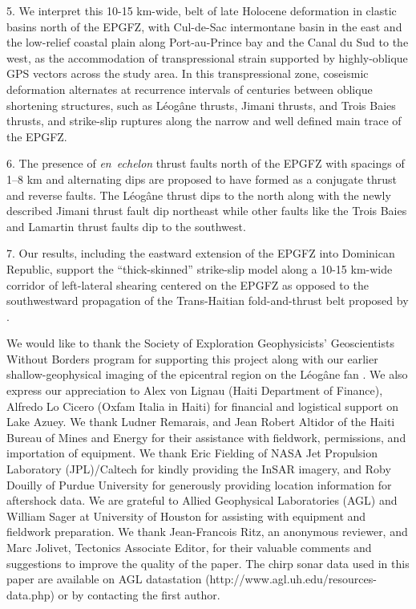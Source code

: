 \documentclass[linenumbers,draft]{agujournal}
\begin{document}
5.  We interpret this 10-15 km-wide, belt of late Holocene deformation in clastic basins north of the EPGFZ, with Cul-de-Sac intermontane basin in the east and the low-relief coastal plain along Port-au-Prince bay and the Canal du Sud to the west, as the accommodation of transpressional strain supported by highly-oblique GPS vectors across the study area. In this transpressional zone, coseismic deformation alternates at recurrence intervals of centuries between oblique shortening structures, such as L\'eog\^ane thrusts, Jimani thrusts, and Trois Baies thrusts, and strike-slip ruptures along the narrow and well defined main trace of the EPGFZ.

6. The presence of \textit{en~echelon} thrust faults north of the EPGFZ with spacings of 1--8 km and alternating dips are proposed to have formed as a conjugate thrust and reverse faults. The L\'eog\^ane thrust dips to the north along with the newly described Jimani thrust fault dip northeast while other faults like the Trois Baies and Lamartin thrust faults dip to the southwest.  

7. Our results, including the eastward extension of the EPGFZ into Dominican Republic, support the ``thick-skinned'' strike-slip model along a 10-15 km-wide corridor of left-lateral shearing centered on the EPGFZ as opposed to the southwestward propagation of the Trans-Haitian fold-and-thrust belt proposed by \citet{pubellier2000plate}.

\acknowledgments
We would like to thank the Society of Exploration Geophysicists' Geoscientists Without Borders program for supporting this project along with our earlier shallow-geophysical imaging of the epicentral region on the L\'eog\^ane fan \citep{kocel2016near}. We also express our appreciation to Alex von Lignau (Haiti Department of Finance), Alfredo Lo Cicero (Oxfam Italia in Haiti) for financial and logistical support on Lake Azuey. We thank Ludner Remarais, and Jean Robert Altidor of the Haiti Bureau of Mines and Energy for their assistance with fieldwork, permissions, and importation of equipment. We thank Eric Fielding of NASA Jet Propulsion Laboratory (JPL)/Caltech for kindly providing the InSAR imagery, and Roby Douilly of Purdue University for generously providing location information for aftershock data. We are grateful to Allied Geophysical Laboratories (AGL) and William Sager at University of Houston for assisting with equipment and fieldwork preparation. We thank Jean-Francois Ritz, an anonymous reviewer, and Marc Jolivet, Tectonics Associate Editor, for their valuable comments and suggestions to improve the quality of the paper. The chirp sonar data used in this paper are available on AGL datastation (http://www.agl.uh.edu/resources-data.php) or by contacting the first author. 
\end{document}
